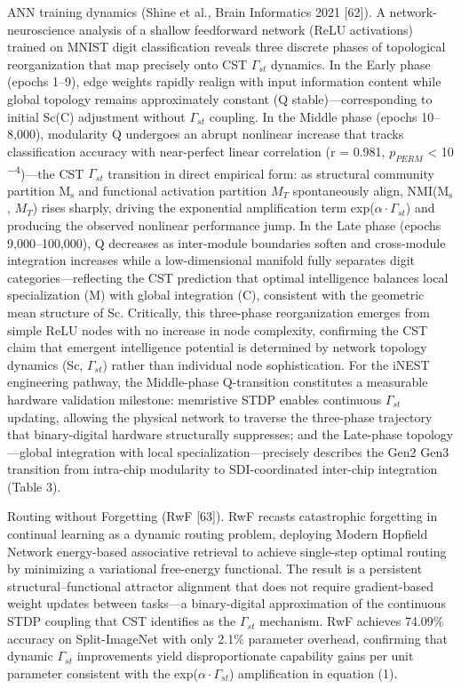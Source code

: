 \documentclass[a4paper,12pt]{article}
\providecommand{\textsubscript}[1]{\ensuremath{_{\text{#1}}}}
\begin{document}
ANN training dynamics (Shine et al., Brain Informatics 2021 [62]).
A network-neuroscience analysis of a shallow feedforward network (ReLU activations) trained on MNIST digit classification reveals three discrete phases of topological reorganization that map precisely onto CST $\Gamma_{st}$ dynamics.
In the Early phase (epochs 1--9), edge weights rapidly realign with input information content while global topology remains approximately constant (Q  \approx  stable)---corresponding to initial Sc(C) adjustment without $\Gamma_{st}$ coupling.
In the Middle phase (epochs 10--8,000), modularity Q undergoes an abrupt nonlinear increase that tracks classification accuracy with near-perfect linear correlation (r = 0.981, $p_{PERM}$ < 10\textsuperscript{$-$}\textsuperscript{4})---the CST $\Gamma_{st}$ transition in direct empirical form: as structural community partition M\textsubscript{s} and functional activation partition $M_{T}$ spontaneously align, NMI(M\textsubscript{s}, $M_{T}$) rises sharply, driving
the exponential amplification term exp($\alpha \cdot \Gamma_{st}$) and producing the observed nonlinear performance jump.
In the Late phase (epochs 9,000--100,000), Q decreases as inter-module boundaries soften and cross-module integration increases while a low-dimensional manifold fully separates digit categories---reflecting the CST prediction that optimal intelligence balances local specialization (M) with global integration (C), consistent with the geometric mean structure of Sc.
Critically, this three-phase reorganization emerges from simple ReLU nodes with no increase in node complexity, confirming the CST claim that emergent intelligence potential is determined by network topology dynamics (Sc, $\Gamma_{st}$) rather than individual node sophistication.
For the iNEST engineering pathway, the Middle-phase Q-transition constitutes a measurable hardware validation milestone: memristive STDP enables continuous $\Gamma_{st}$ updating, allowing the physical network to traverse the three-phase trajectory that binary-digital hardware structurally suppresses; and the Late-phase topology---global integration with local specialization---precisely describes
the Gen2 \rightarrow Gen3 transition from intra-chip modularity to SDI-coordinated inter-chip integration (Table 3).

Routing without Forgetting (RwF [63]).
RwF recasts catastrophic forgetting in continual learning as a dynamic routing problem, deploying Modern Hopfield Network energy-based associative retrieval to achieve single-step optimal routing by minimizing a variational free-energy functional.
The result is a persistent structural--functional attractor alignment that does not require gradient-based weight updates between tasks---a binary-digital approximation of the continuous STDP coupling that CST identifies as the $\Gamma_{st}$ mechanism.
RwF achieves 74.09\% accuracy on Split-ImageNet with only 2.1\% parameter overhead, confirming that dynamic $\Gamma_{st}$ improvements yield disproportionate capability gains per unit parameter consistent with the exp($\alpha \cdot \Gamma_{st}$) amplification in equation (1).
\end{document}
